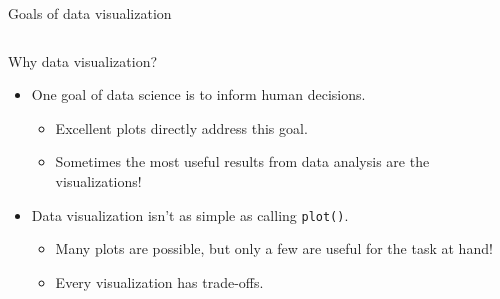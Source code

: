 \documentclass[aspectratio=169]{../latex_main/tntbeamer}  %
\begin{document}
\begin{frame}[c]{Goals of data visualization}
\begin{columns}
\begin{column}{.4\textwidth}
	    \end{column}
	    \end{columns}

	\end{frame}
	
	
	
	\begin{frame}[c]{Why data visualization?}
	    \begin{itemize}
	        \item One goal of data science is to inform human decisions.
	        \begin{itemize}
	            \item Excellent plots directly address this goal.
	            \item Sometimes the most useful results from data analysis are the visualizations!
	        \end{itemize}
	        \item Data visualization isn’t as simple as calling \texttt{plot()}.
	        \begin{itemize}
	            \item Many plots are possible, but only a few are useful for the task at hand!
	            \item Every visualization has trade-offs.
	        \end{itemize}
	    \end{itemize}
	\end{frame}
	
\end{document}
